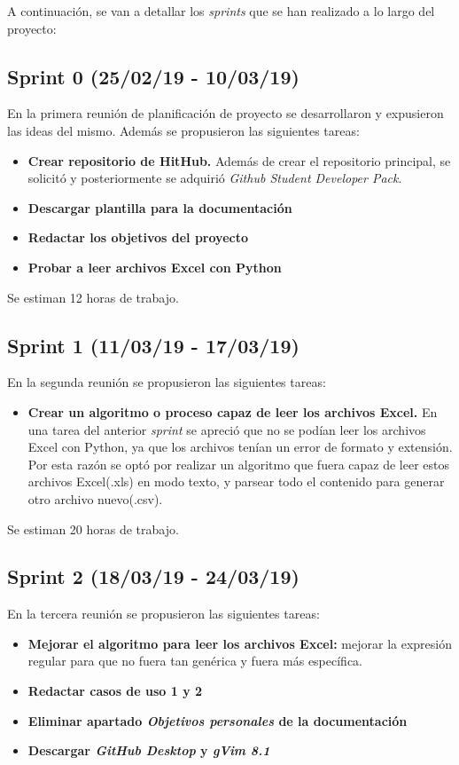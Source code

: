 A continuación, se van a detallar los \emph{sprints} que se han realizado a lo largo del proyecto:

\subsection{Sprint 0 (25/02/19 - 10/03/19)}
En la primera reunión de planificación de proyecto se desarrollaron y expusieron las ideas del mismo. Además se propusieron las siguientes tareas:

\begin{itemize}
\item
\textbf{Crear repositorio de HitHub.} Además de crear el repositorio principal, se solicitó y posteriormente se adquirió \emph{Github Student Developer Pack}.
\item
\textbf{Descargar plantilla para la documentación}
\item
\textbf{Redactar los objetivos del proyecto}
\item
\textbf{Probar a leer archivos Excel con Python}  
\end{itemize}

Se estiman 12 horas de trabajo.


\subsection{Sprint 1 (11/03/19 - 17/03/19)}
En la segunda reunión se propusieron las siguientes tareas:

\begin{itemize}
\item
\textbf{Crear un algoritmo o proceso capaz de leer los archivos Excel.} En una tarea del anterior \emph{sprint} se apreció que no se podían leer los archivos Excel con Python, ya que los archivos tenían un error de formato y extensión. Por esta razón se optó por realizar un algoritmo que fuera capaz de leer estos archivos Excel(.xls) en modo texto, y parsear todo el contenido para generar otro archivo nuevo(.csv).
\end{itemize}

Se estiman 20 horas de trabajo.


\subsection{Sprint 2 (18/03/19 - 24/03/19)} 
En la tercera reunión se propusieron las siguientes tareas:

\begin{itemize}
\item
\textbf{Mejorar el algoritmo para leer los archivos Excel:} mejorar la expresión regular para que no fuera tan genérica y fuera más específica.
\item
\textbf{Redactar casos de uso 1 y 2}
\item
\textbf{Eliminar apartado \emph{Objetivos personales} de la documentación}
\item
\textbf{Descargar \emph{GitHub Desktop} y \emph{gVim 8.1}}
\end{itemize}


